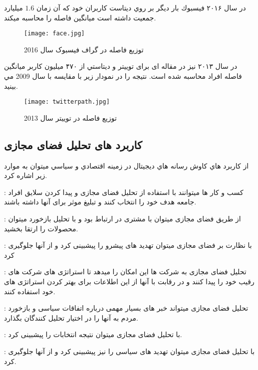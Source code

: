 \documentclass[12pt]{article}
\begin{document}
\newpage

در سال ۲۰۱۶ فيسبوك بار ديگر بر روي ديتاست كاربران خود كه آن زمان $1.6$ ميليارد جمعيت داشته است 
ميانگين فاصله را محاسبه میکند.
\cite{facebook}

\begin{figure}[htbp]
\centering
\texttt{[image: face.jpg]}
\caption{توزیع فاصله در گراف فیسبوک سال 2016}
\end{figure}

\newpage


در سال ۲۰۱۳ نيز در مقاله ای برای توييتر و ديتاستي از ۴۷۰ ميليون كاربر ميانگين فاصله افراد محاسبه شده است. 
نتيجه را در نمودار زير با مقايسه با سال 2009 مي بينيد.
\cite{degseptwitter}

\begin{figure}[htbp]
\centering
\texttt{[image: twitterpath.jpg]}
\caption{توزیع فاصله در توییتر سال 2013}
\end{figure}

\subsection{کاربرد های تحلیل فضای مجازی}
از كاربرد هاي كاوش رسانه هاي ديجيتال در زمينه اقتصادي و سياسي ميتوان به موارد زير اشاره كرد.
\cite{ecpo}


:
 کسب و کار ها میتوانند با استفاده از تحلیل فضای مجازی و پیدا کردن سلایق افراد جامعه هدف خود را انتخاب کنند و تبلیغ موثر برای آنها داشته باشند.

:
 از طریق فضای مجازی میتوان با مشتری در ارتباط بود و با تحلیل بازخورد میتوان محصولات را ارتقا بخشید.


:
 با نظارت بر فضای مجازی میتوان تهدید های پیشرو را پیشبینی کرد و از آنها جلوگیری کرد

:
 تحلیل فضای مجازی به شرکت ها این امکان را میدهد تا استراتژی های شرکت های رقیب خود را پیدا کنند و در رقابت با آنها از این اطلاعات برای بهتر کردن استراتژی های خود استفاده کنند.

:
 تحلیل فضای مجازی میتواند خبر های بسیار مهمی درباره اتفاقات سیاسی و بازخورد مردم به آنها را در اختیار تحلیل کنندگان بگذارد.



:
 با تحلیل فضای مجازی میتوان نتیجه انتخابات را پیشبینی کرد.

:
با تحلیل فضای مجازی میتوان تهدید های سیاسی را نیز پیشبینی کرد و از آنها جلوگیری کرد.
\end{document}
